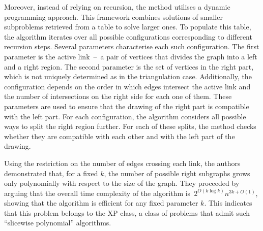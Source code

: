 Moreover, instead of relying on recursion, the method utilises a dynamic programming approach. This framework combines solutions of smaller subproblems retrieved from a table to solve larger ones. To populate this table, the algorithm iterates over all possible configurations corresponding to different recursion steps. Several parameters characterise each such configuration. The first parameter is the active link~--~a pair of vertices that divides the graph into a left and a right region. The second parameter is the set of vertices in the right part, which is not uniquely determined as in the triangulation case. Additionally, the configuration depends on the order in which edges intersect the active link and the number of intersections on the right side for each one of them. These parameters are used to ensure that the drawing of the right part is compatible with the left part. For each configuration, the algorithm considers all possible ways to split the right region further. For each of these splits, the method checks whether they are compatible with each other and with the left part of the drawing.

Using the restriction on the number of edges crossing each link, the authors demonstrated that, for a fixed \(k\), the number of possible right subgraphs grows only polynomially with respect to the size of the graph. They proceeded by arguing that the overall time complexity of the algorithm is~\(2^{O(k \log k)}n^{3k + O(1)}\), showing that the algorithm is efficient for any fixed parameter \(k\). This indicates that this problem belongs to the XP class, a class of problems that admit such ``slicewise polynomial'' algorithms.
